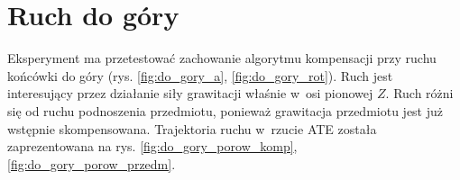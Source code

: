 

\section{Ruch do góry}

Eksperyment ma przetestować zachowanie algorytmu kompensacji przy ruchu końcówki do góry (rys. \ref{fig:do_gory_a}, \ref{fig:do_gory_rot}).  Ruch jest interesujący przez działanie siły grawitacji właśnie w~osi pionowej $Z$. Ruch różni się od ruchu podnoszenia przedmiotu, ponieważ grawitacja przedmiotu jest już wstępnie skompensowana. Trajektoria ruchu w~rzucie ATE została zaprezentowana na rys. \ref{fig:do_gory_porow_komp}, \ref{fig:do_gory_porow_przedm}.

